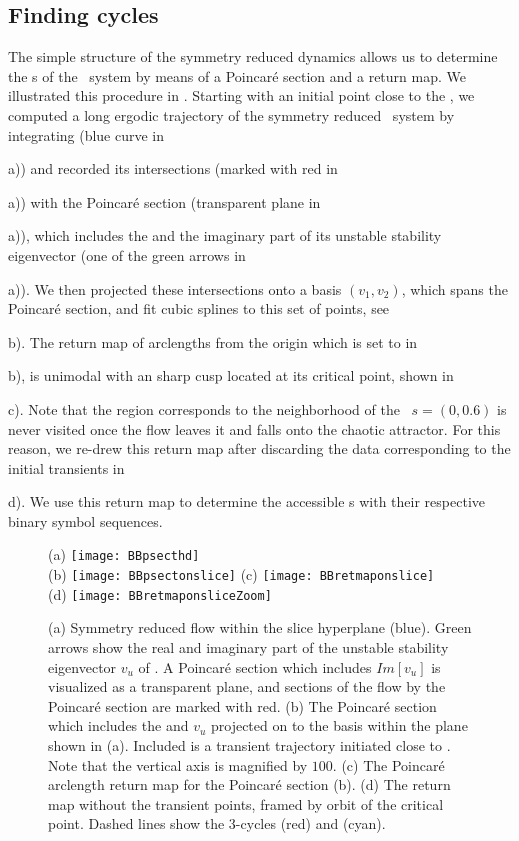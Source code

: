 \subsection{Finding cycles}

The simple structure of the symmetry reduced dynamics allows us to
determine the \rpo s of the \twomode\ system by means of a Poincar\'e
section and a return map. We illustrated this procedure in
. Starting with an initial point close to the
\REQV{}{}, we computed a long ergodic trajectory of the symmetry reduced
\twomode\ system by integrating  (blue curve in
\,{a)) and recorded its intersections (marked
with red in \,{a)) with the Poincar\'e section
(transparent plane in \,{a)), which includes
the \REQV{}{} and the imaginary part of its unstable stability
eigenvector (one of the green arrows in \,{a)).
We then projected these intersections onto a basis $(v_1, v_2)$, which
spans the Poincar\'e section, and fit cubic splines to this set of
points, see \,{b). The return map of arclengths
from the origin which is set to \REQV{}{} in
\,{b), is unimodal with an sharp cusp located at its critical point, shown
in \,{c). Note that the region corresponds to
the neighborhood of the \reqv\ $s = (0, 0.6)$ is never visited once the
flow leaves it and falls onto the chaotic attractor. For this reason, we
re-drew this return map after discarding the data corresponding to the
initial transients in \,{d). We use this return
map to determine the accessible \rpo s  with their respective binary
symbol sequences.

\begin{figure}
\centering
  (a) \texttt{[image: BBpsecthd]} \\
  (b) \texttt{[image: BBpsectonslice]}
  (c) \texttt{[image: BBretmaponslice]} \\
  (d) \texttt{[image: BBretmaponsliceZoom]}
\caption{(a) Symmetry reduced flow within the slice hyperplane (blue).
			Green arrows show the real and imaginary part of the unstable stability
			eigenvector $v_u$ of \REQV{}{}. A Poincar\'e section which includes
			$Im[v_u]$ is visualized as a transparent plane, and sections
			of the flow by the Poincar\'e section are marked with red.
		 (b) The Poincar\'e section which includes the \REQV{}{} and $v_u$ projected
			on to the basis within the plane shown in (a). Included is a
            transient trajectory initiated close to \REQV{}{}. Note that
		  	the vertical axis is magnified by $100$.
		 (c) The Poincar\'e arclength return map for the
		    Poincar\'e section (b).
		 (d) The return map without the transient points, framed by
            orbit of the critical point.
		 	Dashed lines show the 3-cycles  (red) and  (cyan).}
\label{fig:psectandretmap}
\end{figure}

}}}}}}}}
